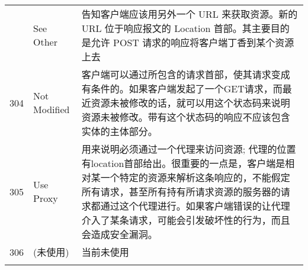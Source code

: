 \begin{longtable}[]{@{}cll@{}}
\begin{minipage}[t]{0.32\columnwidth}
\end{minipage} & \begin{minipage}[t]{0.30\columnwidth}\raggedright\strut
See Other\strut
\end{minipage} & \begin{minipage}[t]{0.30\columnwidth}\raggedright\strut
告知客户端应该用另外一个 URL 来获取资源。新的 URL 位于响应报文的
Location 首部。其主要目的是允许 POST
请求的响应将客户端丁香到某个资源上去\strut
\end{minipage}\tabularnewline
\begin{minipage}[t]{0.32\columnwidth}\centering\strut
304\strut
\end{minipage} & \begin{minipage}[t]{0.30\columnwidth}\raggedright\strut
Not Modified\strut
\end{minipage} & \begin{minipage}[t]{0.30\columnwidth}\raggedright\strut
客户端可以通过所包含的请求首部，使其请求变成有条件的。如果客户端发起了一个GET请求，而最近资源未被修改的话，就可以用这个状态码来说明资源未被修改。带有这个状态码的响应不应该包含实体的主体部分。\strut
\end{minipage}\tabularnewline
\begin{minipage}[t]{0.32\columnwidth}\centering\strut
305\strut
\end{minipage} & \begin{minipage}[t]{0.30\columnwidth}\raggedright\strut
Use Proxy\strut
\end{minipage} & \begin{minipage}[t]{0.30\columnwidth}\raggedright\strut
用来说明必须通过一个代理来访问资源;
代理的位置有location首部给出。很重要的一点是，客户端是相对某一个特定的资源来解析这条响应的，不能假定所有请求，甚至所有持有所请求资源的服务器的请求都通过这个代理进行。如果客户端错误的让代理介入了某条请求，可能会引发破坏性的行为，而且会造成安全漏洞。\strut
\end{minipage}\tabularnewline
\begin{minipage}[t]{0.32\columnwidth}\centering\strut
306\strut
\end{minipage} & \begin{minipage}[t]{0.30\columnwidth}\raggedright\strut
(未使用)\strut
\end{minipage} & \begin{minipage}[t]{0.30\columnwidth}\raggedright\strut
当前未使用\strut
\end{minipage}\tabularnewline
\begin{minipage}[t]{0.32\columnwidth}\centering\strut

\end{minipage}
\end{longtable}

